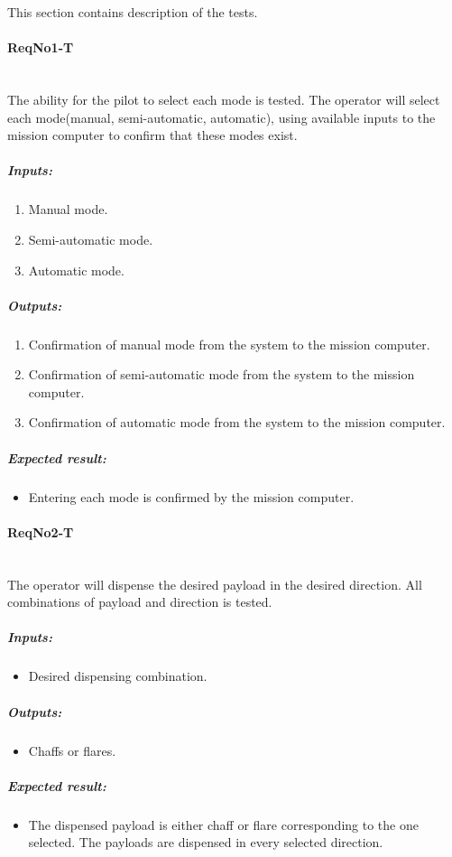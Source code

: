 This section contains description of the tests.

\paragraph{ReqNo1-T}\mbox{}\\ %
The ability for the pilot to select each mode is tested. The operator will select each mode(manual, semi-automatic, automatic), using available inputs to the mission computer to confirm that these modes exist.

\subparagraph{Inputs:}
	\begin{enumerate}
	\item Manual mode.
	\item Semi-automatic mode.
	\item Automatic mode.
	\end{enumerate}
	\subparagraph{Outputs:}
	\begin{enumerate}
	\item Confirmation of manual mode from the system to the mission computer.
	\item Confirmation of semi-automatic mode from the system to the mission computer.
	\item Confirmation of automatic mode from the system to the mission computer.
	\end{enumerate}
	\subparagraph{Expected result:}
	\begin{itemize}
	\item Entering each mode is confirmed by the mission computer.
	\end{itemize}

\paragraph{ReqNo2-T}\mbox{}\\ %
The operator will dispense the desired payload in the desired direction. All combinations of payload and direction is tested.
\\
	\subparagraph{Inputs:}
	\begin{itemize}
	\item Desired dispensing combination.
	\end{itemize}
	\subparagraph{Outputs:}
	\begin{itemize}
	\item Chaffs or flares.
	\end{itemize}
	\subparagraph{Expected result:}
	\begin{itemize}
	\item The dispensed payload is either chaff or flare corresponding to the one selected. The payloads are dispensed in every selected direction.
	\end{itemize}

